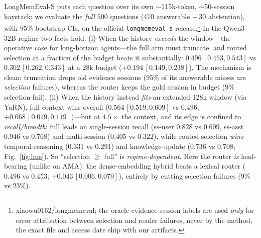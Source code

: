 \documentclass{article} %
\begin{document}
LongMemEval-S puts each question over its own $\sim$115k-token, $\sim$50-session
haystack; we evaluate the \emph{full} $500$ questions ($470$ answerable $+\,30$
abstention), with $95\%$ bootstrap CIs, on the official
\texttt{longmemeval\_s} release.\footnote{xiaowu0162/longmemeval; the oracle
evidence-session labels are used \emph{only} for error attribution between selection
and reader failures, never by the method; the exact file and access date ship with
our artifacts.} In the Qwen3-32B regime two facts hold.
(i) When the history \emph{exceeds} the window---the operative case for long-horizon
agents---the full arm must truncate, and routed selection at a fraction of the budget
beats it substantially: $0.496\,[0.453,0.543]$ vs $0.302\,[0.262,0.343]$ at a 28k budget
($+0.194\,[0.149,0.238]$). The mechanism is clean: truncation drops old evidence
sessions ($95\%$ of its answerable misses are \emph{selection} failures), whereas the
router keeps the gold session in budget ($9\%$ selection-fail). (ii) When the history
instead \emph{fits} an extended 128k window (via YaRN), full context wins overall
($0.564\,[0.519,0.609]$ vs $0.496$; $+0.068\,[0.019,0.119]$)---but at $4.5\times$ the
context, and its edge is confined to \emph{recall/breadth}: full leads on single-session
recall (ss-user $0.828$ vs $0.609$, ss-asst $0.946$ vs $0.768$) and multi-session
($0.405$ vs $0.322$), while routed selection \emph{wins} temporal-reasoning ($0.331$ vs
$0.291$) and knowledge-update ($0.736$ vs $0.708$; Fig.~\ref{fig:lme}). So
``selection $\geq$ full'' is \emph{regime-dependent}. Here the router \emph{is} load-bearing (unlike on AMA): the
dense-embedding hybrid beats a lexical router ($0.496$ vs $0.453$; $+0.043\,[0.006,0.079]$),
entirely by cutting selection failures ($9\%$ vs $23\%$).
\end{document}

